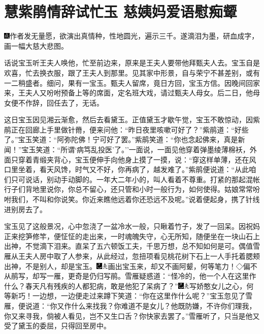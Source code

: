 
\chapter{慧紫鹃情辞试忙玉 慈姨妈爱语慰痴颦}

{\includegraphics[width=3mm]{../Images/00005}作者发无量愿，欲演出真情种，性地圆光，遍示三千。遂滴泪为墨，研血成字，画一幅大慈大悲图。}

话说宝玉听王夫人唤他，忙至前边来，原来是王夫人要带他拜甄夫人去。宝玉自是欢喜，忙去换衣服，跟了王夫人到那里。见其家中形景，自与荣宁不甚差别，或有一二稍盛者。细问，果有一宝玉。甄夫人留席，竟日方回，宝玉方信。因晚间回家来，王夫人又吩咐预备上等的席面，定名班大戏，请过甄夫人母女。后二日，他母女便不作辞，回任去了，无话。

这日宝玉因见湘云渐愈，然后去看黛玉。正值黛玉才歇午觉，宝玉不敢惊动，因紫鹃正在回廊上手里做针黹，便来问他：``昨日夜里咳嗽可好了？''紫鹃道：``好些了。''宝玉笑道：``阿弥陀佛！宁可好了罢。''紫鹃笑道：``你也念起佛来，真是新闻！''宝玉笑道：``所谓`病笃乱投医'了。''一面说，一面见他穿着弹墨绫薄棉袄，外面只穿着青缎夹背心，宝玉便伸手向他身上摸了一摸，说：``穿这样单薄，还在风口里坐着，看天风馋，时气又不好，你再病了，越发难了。''紫鹃便说道：``从此咱们只可说话，别动手动脚的。一年大二年小的，叫人看着不尊重。打紧的那起混帐行子们背地里说你，你总不留心，还只管和小时一般行为，如何使得。姑娘常常吩咐我们，不叫和你说笑。你近来瞧他远着你还恐远不及呢。''说着便起身，携了针线进别房去了。

宝玉见了这般景况，心中忽浇了一盆冷水一般，只瞅着竹子，发了一回呆。因祝妈正来挖笋修竿，便怔怔的走出来，一时魂魄失守，心无所知，随便坐在一块山石上出神，不觉滴下泪来。直呆了五六顿饭工夫，千思万想，总不知如何是可。偶值雪雁从王夫人房中取了人参来，从此经过，忽扭项看见桃花树下石上一人手托着腮颊出神，不是别人，却是宝玉。{\includegraphics[width=3mm]{../Images/00003}\includegraphics[width=3mm]{../Images/00012}\footnotesize \kaishu 画出宝玉来，却又不画阿颦，何等笔力！◇偏不从鹃写，却写一雁，更奇是仍归写鹃。}雪雁疑惑道：``怪冷的，他一个人在这里作什么？春天凡有残疾的人都犯病，敢是他犯了呆病了？''{\includegraphics[width=3mm]{../Images/00003}\includegraphics[width=3mm]{../Images/00012}\footnotesize \kaishu 写娇憨女儿之心，何等新巧！}一边想，一边便走过来蹲下笑道：``你在这里作什么呢？''宝玉忽见了雪雁，便说道：``你又作什么来找我？你难道不是女儿？他既防嫌，不许你们理我，你又来寻我，倘被人看见，岂不又生口舌？你快家去罢了。''雪雁听了，只当是他又受了黛玉的委屈，只得回至房中。

